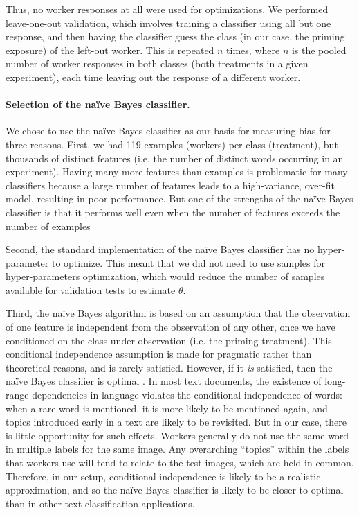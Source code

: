 \documentclass[12pt]{article}
\begin{document}
	Thus, no worker responses at all were used for optimizations.  We 
	performed 
	leave-one-out validation, which involves training a classifier using 
	all but one response, and then having the classifier guess the class
	(in our case, the priming exposure) of the left-out worker.  This is 
	repeated $n$ times, where $n$ is the pooled number of worker responses 
	in both
	classes (both treatments in a given experiment), 
	each time leaving out the response of a different worker.

\paragraph{Selection of the na\"ive Bayes classifier.}
We chose to use the na\"ive Bayes classifier as our basis for measuring 
bias for three reasons.  First, we had 119 examples (workers) per class 
(treatment), but thousands of distinct features 
(i.e. the number of distinct words occurring in an experiment).  
Having many more features than examples is problematic for many classifiers
because a large number of features leads to a high-variance, over-fit model,
resulting in poor performance.  But one of the strengths of the na\"ive 
Bayes classifier is that it performs well even when the number of features
exceeds the number of examples\cite{bickel2004, hastie2009elements}

Second, the standard implementation of the na\"ive Bayes classifier has no 
hyper-parameter to optimize. This meant that we did not need to use 
samples for hyper-parameters optimization, which would reduce the number
of samples available for validation tests to estimate $\theta$.

Third, the na\"ive Bayes algorithm is based on an assumption that the 
observation of one feature is independent from the observation of any 
other, once we have conditioned on the class under observation 
\cite{bishop2006} (i.e. the priming treatment).  This
conditional independence assumption is made for
pragmatic rather than theoretical reasons, and is rarely satisfied.  However,
if it \textit{is} satisfied, then the na\"ive Bayes classifier is 
optimal \cite{Zhang2004562}.  In most text documents, 
the existence of long-range dependencies in language 
violates the conditional independence of words: when a rare word is mentioned,
it is more likely to be mentioned again, and topics introduced early in a
text are likely to be revisited.
But in our case, there is little opportunity for such effects.  Workers 
generally do not use the same word in multiple labels for the same image. 
Any overarching ``topics'' within the labels that workers use will tend to 
relate to the test images, which are held in common.
Therefore, in our setup, conditional independence is likely to be 
a realistic approximation, and so the na\"ive Bayes classifier is likely to
be closer to optimal than in other text classification applications.
\end{document}
